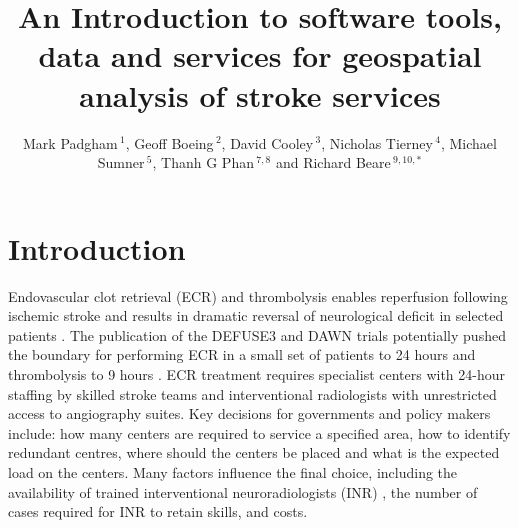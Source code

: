 \documentclass[utf8]{frontiersHLTH}
\def\firstAuthorLast{Padgham {et~al.}} %
\def\Authors{Mark Padgham\,$^{1}$, Geoff Boeing\,$^{2}$, David Cooley\,$^{3}$, Nicholas Tierney\,$^{4}$, Michael Sumner\,$^{5}$, Thanh G Phan\,$^{7,8}$ and Richard Beare\,$^{9,10,*}$}
\begin{document}
\onecolumn
{}

\title[Software tools for geospatial analysis]{An Introduction to software tools, data and services for geospatial analysis of stroke services}

\author[\firstAuthorLast ]{\Authors} %
\address{} %
\correspondance{} %

\extraAuth{}%

\maketitle

\section{Introduction}\label{introduction}

Endovascular clot retrieval (ECR) and thrombolysis enables reperfusion following ischemic
stroke and results in dramatic reversal of neurological deficit in
selected patients
\cite{berkhemer2015randomized,goyal2016endovascular,goyal2015randomized,campbell2015endovascular,saver2015stent,ma2019thrombolysis}. 
The publication of the DEFUSE3 and DAWN trials potentially pushed the
boundary for performing ECR in a small set of patients to 24
hours\cite{nogueira2018thrombectomy,albers2018thrombectomy} and
thrombolysis to 9 hours \cite{ma2019thrombolysis}. ECR treatment requires
specialist centers with 24-hour staffing by skilled stroke teams and
interventional radiologists with unrestricted access to angiography
suites. Key decisions for governments and policy makers include: how
many centers are required to service a specified area, how to identify
redundant centres, where should
the centers be placed and what is the expected load on the
centers\cite{Phan_2017}. Many factors influence the final choice,
including the availability of trained interventional neuroradiologists
(INR) , the number of cases required for INR to retain skills, and
costs.
\end{document}
